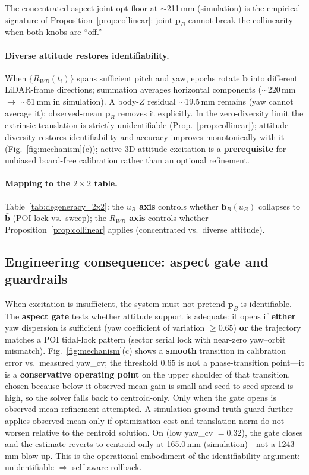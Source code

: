 The concentrated-aspect joint-opt floor at $\sim$211\,mm (simulation) is the empirical
signature of Proposition~\ref{prop:collinear}: joint $\mathbf{p}_B$ cannot break the
collinearity when both knobs are ``off.''

\paragraph{Diverse attitude restores identifiability.}
When $\{R_{WB}(t_i)\}$ spans sufficient pitch and yaw, epochs rotate
$\bar{\mathbf{b}}$ into different LiDAR-frame directions; summation averages
horizontal components ($\sim$220\,mm $\to$ $\sim$51\,mm in simulation).
A body-$Z$ residual $\sim$19.5\,mm remains (yaw cannot average it); observed-mean
$\mathbf{p}_B$ removes it explicitly.
In the zero-diversity limit the extrinsic translation is strictly unidentifiable
(Prop.~\ref{prop:collinear}); attitude diversity restores identifiability and
accuracy improves monotonically with it (Fig.~\ref{fig:mechanism}(c)); active 3D
attitude excitation is a \textbf{prerequisite} for unbiased board-free calibration
rather than an optional refinement.

\paragraph{Mapping to the $2\times2$ table.}
Table~\ref{tab:degeneracy_2x2}: the \textbf{$u_B$ axis} controls whether
$\mathbf{b}_B(u_B)$ collapses to $\bar{\mathbf{b}}$ (POI-lock vs.\ sweep); the
\textbf{$R_{WB}$ axis} controls whether Proposition~\ref{prop:collinear} applies
(concentrated vs.\ diverse attitude).

\subsection{Engineering consequence: aspect gate and guardrails}
When excitation is insufficient, the system must not pretend $\mathbf{p}_B$ is
identifiable.
The \textbf{aspect gate} tests whether attitude support is adequate: it opens if
\textbf{either} yaw dispersion is sufficient (yaw coefficient of variation
$\geq 0.65$) \textbf{or} the trajectory matches a POI tidal-lock pattern (sector
serial lock with near-zero yaw--orbit mismatch).
Fig.~\ref{fig:mechanism}(c) shows a \textbf{smooth} transition in calibration error
vs.\ measured yaw\_cv; the threshold $0.65$ is \textbf{not} a phase-transition
point---it is a \textbf{conservative operating point} on the upper shoulder of that
transition, chosen because below it observed-mean gain is small and seed-to-seed
spread is high, so the solver falls back to centroid-only.
Only when the gate opens is observed-mean refinement attempted.
A simulation ground-truth guard further applies observed-mean only if optimization cost
and translation norm do not worsen relative to the centroid solution.
On \flightY{} (low yaw\_cv $=0.32$), the gate closes and the estimate reverts to
centroid-only at 165.0\,mm (simulation)---not a 1243\,mm blow-up.
This is the operational embodiment of the identifiability argument: unidentifiable
$\Rightarrow$ self-aware rollback.

